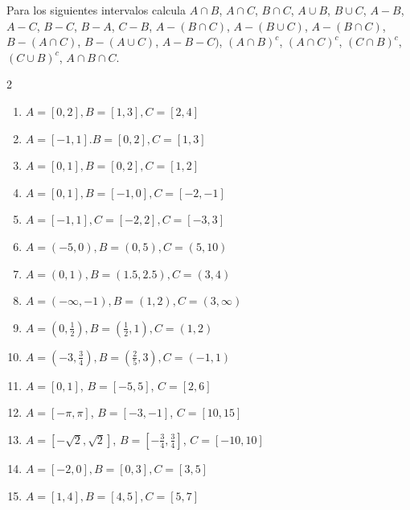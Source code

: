 \begin{Ejer}
Para los siguientes intervalos calcula $A\cap B$, $A\cap C$, $B\cap C$, $A\cup B$, $B\cup C$, $A-B$, $A-C$, $B-C$, $B-A$, $C-B$, $A-(B\cap C)$, $A-(B\cup C)$, $A-(B\cap C)$, $B-(A\cap C)$, $B-(A\cup C)$, $A-B-C)$, $(A\cap B)^{c}$, $(A\cap C)^{c}$, $(C\cap B)^{c}$, $(C\cup B)^{c}$, $A\cap B \cap C$.
\begin{multicols}{2}
\begin{enumerate}
\item $A= [0,2], B= [1,3], C= [2,4]$

\item $A= [-1,1]. B= [0,2], C= [1,3]$

\item $A= [0,1],B= [0,2],C= [1,2]$

\item $A= [0,1], B= [-1,0], C=[-2,-1]$

\item  $A= [-1,1], C= [-2,2], C=[-3,3]$

\item $A=(-5, 0),B=(0, 5),C=(5, 10)$

\item $A=(0, 1),B=(1.5, 2.5),C=(3, 4)$

\item $A= (-\infty, -1),B=(1, 2),C=(3, \infty)$

\item $A= (0, \frac{1}{2}),B= (\frac{1}{2}, 1), C= (1, 2)$

\item $A= (-3, \frac{3}{4}),B= (\frac{2}{5}, 3), C= (-1, 1)$

\item $A= [0,1]$, $B= [-5,5]$, $C= [2,6]$

\item $A= [-\pi,\pi]$, $B= [-3,-1]$, $C=[10,15]$

\item $A= [-\sqrt{2},\sqrt{2}]$, $B= [-\frac{3}{4},\frac{3}{4}]$, $C=[-10,10]$

\item $A= [-2, 0],B=[0, 3],C= [3, 5]$

\item $A= [1, 4],B=[4, 5],C=[5, 7]$

\end{enumerate}
\end{multicols}
\end{Ejer}



